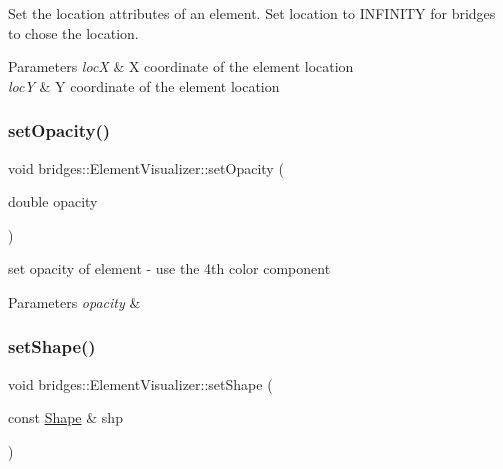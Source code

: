 Set the location attributes of an element. Set location to I\+N\+F\+I\+N\+I\+TY for bridges to chose the location.


\begin{DoxyParams}{Parameters}
{\em locX} & X coordinate of the element location \\
\hline
{\em locY} & Y coordinate of the element location \\
\hline
\end{DoxyParams}
\mbox{\label{classbridges_1_1_element_visualizer_a8f77db4a2774021aec4ab8ea18e50fc9}} 
\subsubsection{\texorpdfstring{set\+Opacity()}{setOpacity()}}
{\footnotesize\ttfamily void bridges\+::\+Element\+Visualizer\+::set\+Opacity (\begin{DoxyParamCaption}\item[{double}]{opacity }\end{DoxyParamCaption})\hspace{0.3cm}{\ttfamily [inline]}}

set opacity of element -\/ use the 4th color component


\begin{DoxyParams}{Parameters}
{\em opacity} & \\
\hline
\end{DoxyParams}
\mbox{\label{classbridges_1_1_element_visualizer_af81cc20423f2fedffa81fb7c473a1179}} 
\subsubsection{\texorpdfstring{set\+Shape()}{setShape()}}
{\footnotesize\ttfamily void bridges\+::\+Element\+Visualizer\+::set\+Shape (\begin{DoxyParamCaption}\item[{const \mbox{\hyperlink{namespacebridges_a1b4050586bd708782ae0d4f3b06b9579}{Shape}} \&}]{shp }\end{DoxyParamCaption})\hspace{0.3cm}{\ttfamily [inline]}}

